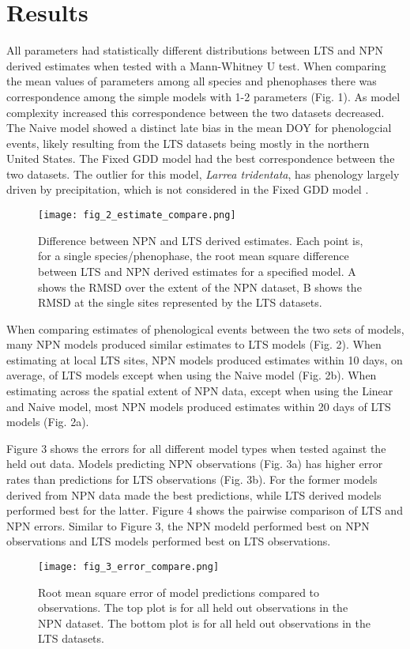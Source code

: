 \documentclass[fleqn,10pt,lineno]{wlpeerj} %
\begin{document}
\section*{Results}

All parameters had statistically different distributions between LTS and NPN derived estimates when tested with a Mann-Whitney U test. When comparing the mean values of parameters among all species and phenophases there was correspondence among the simple models with 1-2 parameters (Fig. 1). As model complexity increased this correspondence between the two datasets decreased. The Naive model showed a distinct late bias in the mean DOY for phenologcial events, likely resulting from the LTS datasets being mostly in the northern United States. The Fixed GDD model had the best correspondence between the two datasets. The outlier for this model, \textit{Larrea tridentata}, has phenology largely driven by precipitation, which is not considered in the Fixed GDD model \citep{beatley1974}. 

\begin{figure}
	\centering
		\texttt{[image: fig\_2\_estimate\_compare.png]}
	\caption{Difference between NPN and LTS derived estimates. Each point is, for a single species/phenophase, the root mean square difference between LTS and NPN derived estimates for a specified model. A shows the RMSD over the extent of the NPN dataset, B shows the RMSD at the single sites represented by the LTS datasets.}
\end{figure}

When comparing estimates of phenological events between the two sets of models, many NPN models produced similar estimates to LTS models (Fig. 2). When estimating at local LTS sites, NPN models produced estimates within 10 days, on average, of LTS models except when using the Naive model (Fig. 2b). When estimating across the spatial extent of NPN data, except when using the Linear and Naive model, most NPN models produced estimates within 20 days of LTS models (Fig. 2a). 

Figure 3 shows the errors for all different model types when tested against the held out data. Models predicting NPN observations (Fig. 3a) has higher error rates than predictions for LTS observations (Fig. 3b). For the former models derived from NPN data made the best predictions, while LTS derived models performed best for the latter. Figure 4 shows the pairwise comparison of LTS and NPN errors. Similar to Figure 3, the NPN modeld performed best on NPN observations and LTS models performed best on LTS observations. 
\begin{figure}
	\centering
		\texttt{[image: fig\_3\_error\_compare.png]}
	\caption{Root mean square error of model predictions compared to observations. The top plot is for all held out observations in the NPN dataset. The bottom plot is for all held out observations in the LTS datasets.}
\end{figure}
\end{document}
